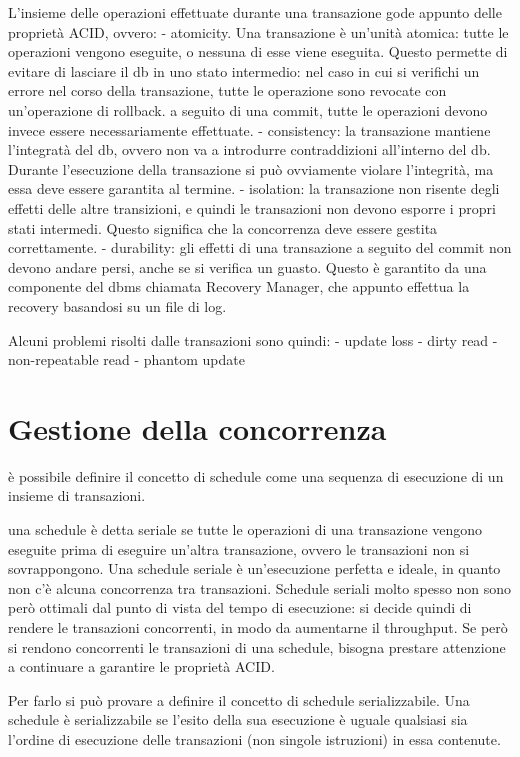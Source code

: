 L'insieme delle operazioni effettuate durante una transazione gode appunto
delle proprietà ACID, ovvero:
- atomicity. Una transazione è un'unità atomica: tutte le operazioni vengono
eseguite, o nessuna di esse viene eseguita. Questo permette di evitare di
lasciare il db in uno stato intermedio: nel caso in cui si verifichi un errore
nel corso della transazione, tutte le operazione sono revocate con un'operazione di
rollback. a seguito di una commit, tutte le operazioni devono invece essere
necessariamente effettuate.
- consistency: la transazione mantiene l'integratà del db, ovvero non va a
introdurre contraddizioni all'interno del db. Durante l'esecuzione
della transazione si può ovviamente violare l'integrità, ma essa deve essere
garantita al termine.
- isolation: la transazione non risente degli effetti delle altre transizioni,
e quindi le transazioni non devono esporre i propri stati intermedi.
Questo significa che la concorrenza deve essere gestita correttamente.
- durability: gli effetti di una transazione a seguito del commit non devono
andare persi, anche se si verifica un guasto. Questo è garantito da una
componente del dbms chiamata Recovery Manager, che appunto effettua la
recovery basandosi su un file di log.


Alcuni problemi risolti dalle transazioni sono quindi:
- update loss
- dirty read
- non-repeatable read
- phantom update

\section{Gestione della concorrenza}
è possibile definire il concetto di schedule come una sequenza di esecuzione
di un insieme di transazioni.

una schedule è detta seriale se tutte le operazioni di una transazione
vengono eseguite prima di eseguire un'altra transazione, ovvero le transazioni
non si sovrappongono.
Una schedule seriale è un'esecuzione perfetta e ideale, in quanto non c'è
alcuna concorrenza tra transazioni. Schedule seriali molto spesso non sono
però ottimali dal punto di vista del tempo di esecuzione: si decide
quindi di rendere le transazioni concorrenti, in modo da aumentarne il throughput.
Se però si rendono concorrenti le transazioni di una schedule, bisogna prestare
attenzione a continuare a garantire le proprietà ACID.

Per farlo si può provare a definire il concetto di schedule serializzabile.
Una schedule è serializzabile se l'esito della sua esecuzione è uguale
qualsiasi sia l'ordine di esecuzione delle transazioni (non singole istruzioni)
in essa contenute.

